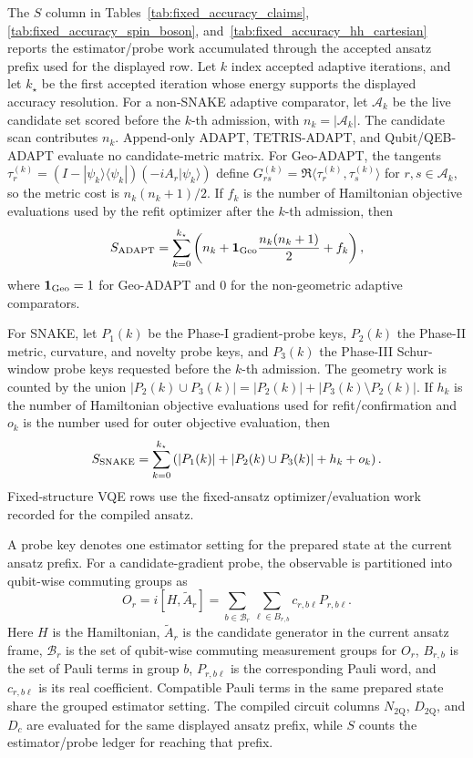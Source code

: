 \documentclass[
  reprint,
  amsmath,
  amssymb,
  aps,
  pra,
  nofootinbib,
  superscriptaddress,
  floatfix
]{revtex4-2}
\newcommand{\twq}{\mathrm{2Q}}
\begin{document}
The \(S\) column in Tables~\ref{tab:fixed_accuracy_claims}, \ref{tab:fixed_accuracy_spin_boson}, and~\ref{tab:fixed_accuracy_hh_cartesian} reports the estimator/probe work accumulated through the accepted ansatz prefix used for the displayed row.  Let \(k\) index accepted adaptive iterations, and let \(k_\star\) be the first accepted iteration whose energy supports the displayed accuracy resolution.  For a non-SNAKE adaptive comparator, let \(\mathcal A_k\) be the live candidate set scored before the \(k\)-th admission, with \(n_k=|\mathcal A_k|\).  The candidate scan contributes \(n_k\).  Append-only ADAPT, TETRIS-ADAPT, and Qubit/QEB-ADAPT evaluate no candidate-metric matrix.  For Geo-ADAPT, the tangents \(\tau_r^{(k)}=(I-|\psi_k\rangle\langle\psi_k|)(-iA_r|\psi_k\rangle)\) define \(G_{rs}^{(k)}=\Re\langle\tau_r^{(k)},\tau_s^{(k)}\rangle\) for \(r,s\in\mathcal A_k\), so the metric cost is \(n_k(n_k+1)/2\).  If \(f_k\) is the number of Hamiltonian objective evaluations used by the refit optimizer after the \(k\)-th admission, then
\begin{equation}
S_{\rm ADAPT}
=
\sum_{k=0}^{k_\star}
\left(
n_k+\mathbf 1_{\rm Geo}\frac{n_k(n_k+1)}{2}+f_k
\right),
\label{eq:appendix_s_adapt}
\end{equation}
where \(\mathbf 1_{\rm Geo}=1\) for Geo-ADAPT and \(0\) for the non-geometric adaptive comparators.

For SNAKE, let \(P_1(k)\) be the Phase-I gradient-probe keys, \(P_2(k)\) the Phase-II metric, curvature, and novelty probe keys, and \(P_3(k)\) the Phase-III Schur-window probe keys requested before the \(k\)-th admission.  The geometry work is counted by the union \(|P_2(k)\cup P_3(k)|=|P_2(k)|+|P_3(k)\setminus P_2(k)|\).  If \(h_k\) is the number of Hamiltonian objective evaluations used for refit/confirmation and \(o_k\) is the number used for outer objective evaluation, then
\begin{equation}
S_{\rm SNAKE}
=
\sum_{k=0}^{k_\star}
\left(
|P_1(k)|+|P_2(k)\cup P_3(k)|+h_k+o_k
\right).
\label{eq:appendix_s_snake}
\end{equation}
Fixed-structure VQE rows use the fixed-ansatz optimizer/evaluation work recorded for the compiled ansatz.

A probe key denotes one estimator setting for the prepared state at the current ansatz prefix.  For a candidate-gradient probe, the observable is partitioned into qubit-wise commuting groups as
\begin{equation}
O_r=i[H,\widetilde A_r]
=\sum_{b\in\mathcal B_r}\sum_{\ell\in B_{r,b}}
c_{r,b\ell}P_{r,b\ell} .
\label{eq:appendix_grouped_gradient}
\end{equation}
Here \(H\) is the Hamiltonian, \(\widetilde A_r\) is the candidate generator in the current ansatz frame, \(\mathcal B_r\) is the set of qubit-wise commuting measurement groups for \(O_r\), \(B_{r,b}\) is the set of Pauli terms in group \(b\), \(P_{r,b\ell}\) is the corresponding Pauli word, and \(c_{r,b\ell}\) is its real coefficient. Compatible Pauli terms in the same prepared state share the grouped estimator setting.  The compiled circuit columns \(N_{\twq}\), \(D_{\twq}\), and \(D_c\) are evaluated for the same displayed ansatz prefix, while \(S\) counts the estimator/probe ledger for reaching that prefix.
\end{document}
